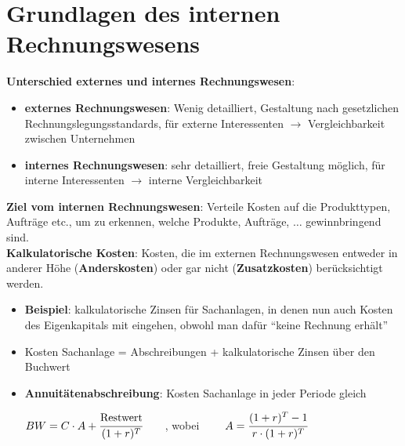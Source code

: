 \section{Grundlagen des internen Rechnungswesens}

\textbf{Unterschied externes und internes Rechnungswesen}:
\begin{itemize}
	\item \textbf{externes Rechnungswesen}: Wenig detailliert, Gestaltung nach gesetzlichen Rechnungslegungsstandards, für externe Interessenten $\rightarrow$ Vergleichbarkeit zwischen Unternehmen
	\item \textbf{internes Rechnungswesen}: sehr detailliert, freie Gestaltung möglich, für interne Interessenten $\rightarrow$ interne Vergleichbarkeit
\end{itemize}

\textbf{Ziel vom internen Rechnungswesen}: Verteile Kosten auf die Produkttypen, Aufträge etc., um zu erkennen, welche Produkte, Aufträge, $\ldots$ gewinnbringend sind.\\

\textbf{Kalkulatorische Kosten}: Kosten, die im externen Rechnungswesen entweder in anderer Höhe (\textbf{Anderskosten}) oder gar nicht (\textbf{Zusatzkosten}) berücksichtigt werden.
\begin{itemize}
	\item \textbf{Beispiel}: kalkulatorische Zinsen für Sachanlagen, in denen nun auch Kosten des Eigenkapitals mit eingehen, obwohl man dafür \enquote{keine Rechnung erhält}
	\item Kosten Sachanlage = Abschreibungen + kalkulatorische Zinsen über den Buchwert
	\item \textbf{Annuitätenabschreibung}: Kosten Sachanlage in jeder Periode gleich
	\begin{tightcenter}
		$BW=C\cdot A+\cfrac{\text{Restwert}}{(1+r)^T}\qquad$, wobei $\qquad A=\cfrac{(1+r)^T-1}{r\cdot (1+r)^T}$
	\end{tightcenter}
\end{itemize}

